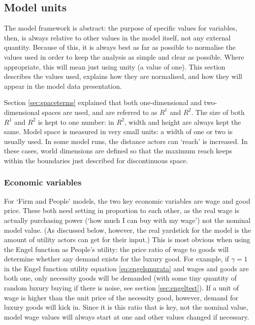 \subsection{Model units \label{sec:modelunits}}

The model framework is abstract: the purpose of specific values for variables, then, is always relative to other values in the model itself, not any external quantity. Because of this, it is always best as far as possible to normalise the values used in order to keep the analysis as simple and clear as possible. Where appropriate, this will mean just using unity (a value of one). This section describes the values used, explains how they are normalised, and how they will appear in the model data presentation.

Section \ref{sec:spaceterms} explained that both one-dimensional and two-dimensional spaces are used, and are referred to as $R^1$ and $R^2$. The size of both $R^1$ and $R^2$ is kept to one number: in $R^2$, width and height are always kept the same. Model space is measured in very small units: a width of one or two is usually used. In some model runs, the distance actors can `reach' is increased. In these cases, world dimensions are defined so that the maximum reach keeps within the boundaries just described for discontinuous space.

\subsubsection{Economic variables}

For `Firm and People' models, the two key economic variables are wage and good price. These both need setting in proportion to each other, as the real wage is actually purchasing power (`how much I can buy with my wage') not the nominal model value. (As discussed below, however, the real yardstick for the model is the amount of utility actors can get for their input.) This is most obvious when using the Engel function as People's utility: the price ratio of wage to goods will determine whether any demand exists for the luxury good. For example, if $\gamma=1$ in the Engel function utility equation \eqref{eq:engelsmurata} and wages and goods are both one, only necessity goods will be demanded (with some tiny quantity of random luxury buying if there is noise, see section \ref{sec:engeltest}). If a unit of wage is higher than the unit price of the necessity good, however, demand for luxury goods will kick in. Since it is this ratio that is key, not the nominal value, model wage values will always start at one and other values changed if necessary.

